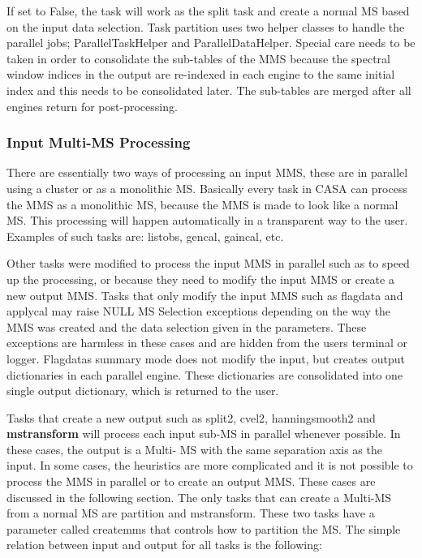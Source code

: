 If set to False, the task will work as the split task and create a normal MS based on the input data selection.
Task partition uses two helper classes to handle the parallel jobs; ParallelTaskHelper and
ParallelDataHelper. Special care needs to be
taken in order to consolidate the sub-tables of the MMS because the spectral window indices
in the output are re-indexed in each engine to the same initial index and this needs to be
consolidated later. The sub-tables are merged after all engines return for post-processing.


\subsubsection{Input Multi-MS Processing}
There are essentially two ways of processing an input MMS, these are in parallel using a
cluster or as a monolithic MS. Basically every task in CASA can process the MMS as a
monolithic MS, because the MMS is made to look like a normal MS. This processing will
happen automatically in a transparent way to the user. Examples of such tasks are: listobs,
gencal, gaincal, etc.

Other tasks were modified to process the input MMS in parallel such as to speed up the
processing, or because they need to modify the input MMS or create a new output MMS.
Tasks that only modify the input MMS such as flagdata and applycal may raise NULL MS
Selection exceptions depending on the way the MMS was created and the data selection given
in the parameters. These exceptions are harmless in these cases and are hidden
from the user\’s terminal or logger. Flagdata\’s summary mode does not modify
the input, but creates output dictionaries in each parallel engine. These dictionaries are consolidated into 
one single output dictionary, which is returned to the user.

Tasks that create a new output such as split2, cvel2, hanningsmooth2 and
{\bf mstransform} will process each input sub-MS in parallel whenever possible.
In these cases, the output is a Multi- MS with the same separation axis as the input. In some cases, 
the heuristics are more complicated and it is not possible to process the MMS in
parallel or to create an output MMS. These cases are discussed in the following
section. The only tasks that can create a Multi-MS from a normal MS are
partition and mstransform. These two tasks have a parameter called createmms that controls how to
partition the MS. The simple relation between input and output for all tasks is the following:

